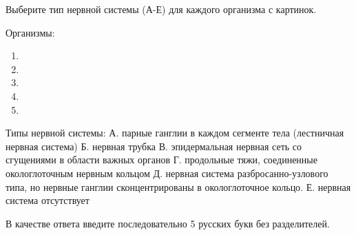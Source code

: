 
Выберите тип нервной системы (А-Е) для каждого организма с картинок.

Организмы: 

\begin{enumerate}
    \item {}
    \item {}
    \item {}
    \item {}
    \item {}
\end{enumerate}

Типы нервной системы:
А. парные ганглии в каждом сегменте тела (лестничная нервная система)
Б. нервная трубка
В. эпидермальная нервная сеть со сгущениями в области важных органов
Г. продольные тяжи, соединенные окологлоточным нервным кольцом
Д. нервная система разбросанно-узлового типа, но нервные ганглии сконцентрированы в окологлоточное кольцо.
Е. нервная система отсутствует

В качестве ответа введите последовательно 5 русских букв без разделителей.

